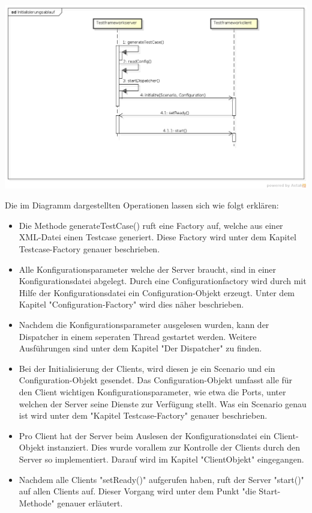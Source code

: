 \begin{center}
\includegraphics[scale=0.3]{image_testFramework/TestFWInit.png}
\end{center}

Die im Diagramm dargestellten Operationen lassen sich wie folgt erklären:

\begin{itemize}
\item Die Methode generateTestCase() ruft eine Factory auf, welche aus einer XML-Datei einen Testcase generiert. Diese Factory wird unter dem Kapitel Testcase-Factory genauer beschrieben.
\item Alle Konfigurationsparameter welche der Server braucht, sind in einer Konfigurationsdatei abgelegt. Durch eine Configurationfactory wird durch mit Hilfe der Konfigurationsdatei ein Configuration-Objekt erzeugt. Unter dem Kapitel "Configuration-Factory" wird dies näher beschrieben.
\item Nachdem die Konfigurationsparameter ausgelesen wurden, kann der Dispatcher in einem seperaten Thread gestartet werden. Weitere Ausführungen sind unter dem Kapitel "Der Dispatcher" zu finden.
\item Bei der Initialisierung der Clients, wird diesen je ein Scenario und ein Configuration-Objekt gesendet. Das Configuration-Objekt umfasst alle für den Client wichtigen Konfigurationsparameter, wie etwa die Ports, unter welchen der Server seine Dienste zur Verfügung stellt. Was ein Scenario genau ist wird unter dem "Kapitel Testcase-Factory" genauer beschrieben.
\item Pro Client hat der Server beim Auslesen der Konfigurationsdatei ein Client-Objekt instanziert. Dies wurde vorallem zur Kontrolle der Clients durch den Server so implementiert. Darauf wird im Kapitel "ClientObjekt" eingegangen.
\item Nachdem alle Clients "setReady()" aufgerufen haben, ruft der Server "start()" auf allen Clients auf. Dieser Vorgang wird unter dem Punkt "die Start-Methode" genauer erläutert.
\end{itemize}

